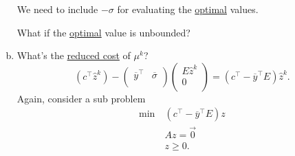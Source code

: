 \begin{prev}
\begin{enumerate}[(a)]
		      \begin{note}
			      We need to include \(-\sigma\) for evaluating the \hyperref[def:optimal-solution]{optimal} values.
		      \end{note}

		      \begin{problem*}
			      What if the \hyperref[def:optimal-solution]{optimal} value is unbounded?
		      \end{problem*}
		\item What's the \hyperref[def:reduced-cost]{reduced cost} of \(\mu^k\)?
		      \[
			      (c^{\top}\hat{z}^k) - \begin{pmatrix}
				      \overline{y}^{\top} & \overline{\sigma} \\
			      \end{pmatrix}\begin{pmatrix}
				      E \hat{z}^k \\
				      0           \\
			      \end{pmatrix} =  (c^{\top} - \overline{y}^{\top}E)\hat{z}^k.
		      \]
		      Again, consider a sub problem
		      \[
			      \begin{aligned}
				      \min~ & (c^{\top} - \overline{y}^{\top}E)z \\
				            & Az = \vec{0}                       \\
				            & z\geq 0.
			      \end{aligned}
		      \]


\end{enumerate}
\end{prev}
